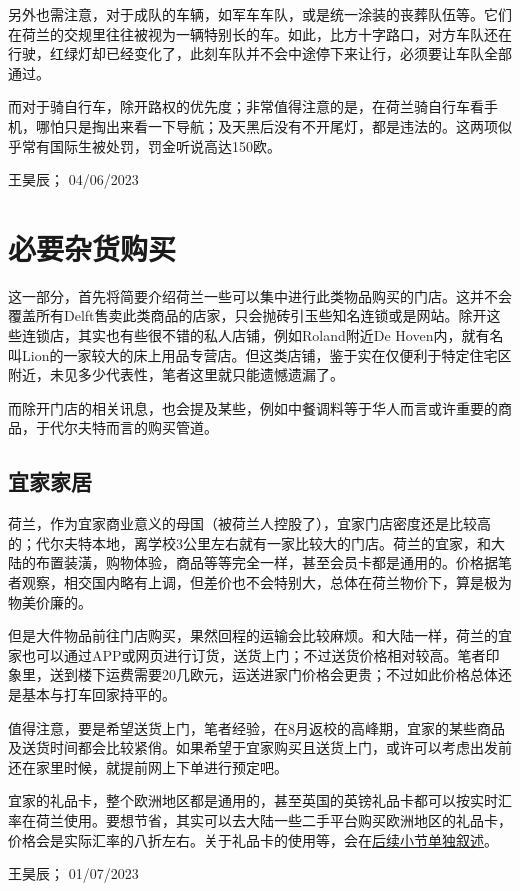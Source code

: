 另外也需注意，对于成队的车辆，如军车车队，或是统一涂装的丧葬队伍等。它们在荷兰的交规里往往被视为一辆特别长的车。如此，比方十字路口，对方车队还在行驶，红绿灯却已经变化了，此刻车队并不会中途停下来让行，必须要让车队全部通过。

而对于骑自行车，除开路权的优先度；非常值得注意的是，在荷兰骑自行车看手机，哪怕只是掏出来看一下导航；及天黑后没有不开尾灯，都是违法的。这两项似乎常有国际生被处罚，罚金听说高达150欧。
\begin{flushright}
王昊辰； 04/06/2023
\end{flushright}

\vspace{\betsubsec} %
\section{必要杂货购买}
这一部分，首先将简要介绍荷兰一些可以集中进行此类物品购买的门店。这并不会覆盖所有Delft售卖此类商品的店家，只会抛砖引玉些知名连锁或是网站。除开这些连锁店，其实也有些很不错的私人店铺，例如Roland附近De Hoven内，就有名叫Lion的一家较大的床上用品专营店。但这类店铺，鉴于实在仅便利于特定住宅区附近，未见多少代表性，笔者这里就只能遗憾遗漏了。

而除开门店的相关讯息，也会提及某些，例如中餐调料等于华人而言或许重要的商品，于代尔夫特而言的购买管道。

\subsection{宜家家居}
荷兰，作为宜家商业意义的母国（被荷兰人控股了），宜家门店密度还是比较高的；代尔夫特本地，离学校3公里左右就有一家比较大的门店。荷兰的宜家，和大陆的布置装潢，购物体验，商品等等完全一样，甚至会员卡都是通用的。价格据笔者观察，相交国内略有上调，但差价也不会特别大，总体在荷兰物价下，算是极为物美价廉的。

但是大件物品前往门店购买，果然回程的运输会比较麻烦。和大陆一样，荷兰的宜家也可以通过APP或网页进行订货，送货上门；不过送货价格相对较高。笔者印象里，送到楼下运费需要20几欧元，运送进家门价格会更贵；不过如此价格总体还是基本与打车回家持平的。

值得注意，要是希望送货上门，笔者经验，在8月返校的高峰期，宜家的某些商品及送货时间都会比较紧俏。如果希望于宜家购买且送货上门，或许可以考虑出发前还在家里时候，就提前网上下单进行预定吧。

宜家的礼品卡，整个欧洲地区都是通用的，甚至英国的英镑礼品卡都可以按实时汇率在荷兰使用。要想节省，其实可以去大陆一些二手平台购买欧洲地区的礼品卡，价格会是实际汇率的八折左右。关于礼品卡的使用等，会在\hyperlink{礼品卡}{\uline{后续小节单独叙述}}。
\begin{flushright}
王昊辰； 01/07/2023
\end{flushright}

